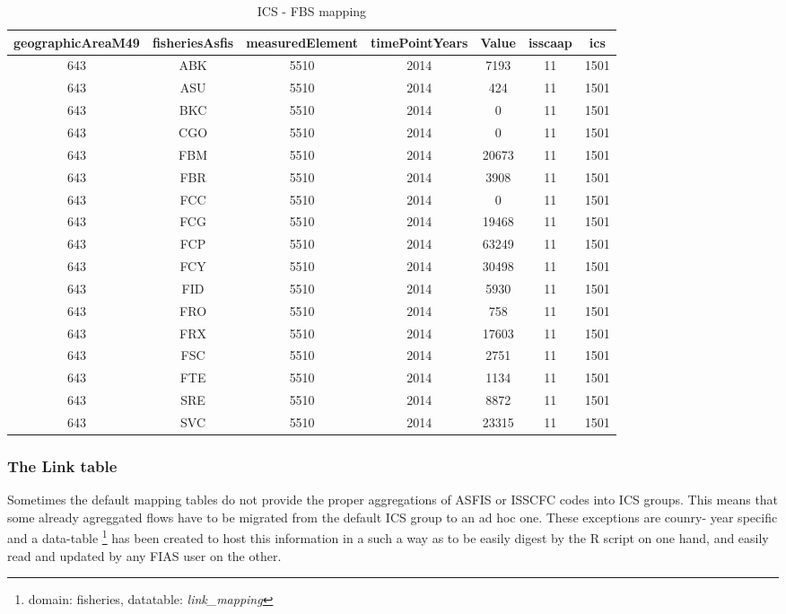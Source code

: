 \documentclass[nojss]{jss}
\begin{document}
\begin{landscape}
\begin{table}[t]
\caption{ICS - FBS mapping}
\centering
\begin{tabular}{c|c|c|c|c|c|c}
\toprule
geographicAreaM49 & fisheriesAsfis & measuredElement & timePointYears & Value & isscaap & ics \\
\midrule
643   &  ABK    & 5510 & 2014 &   7193   & 11 &  1501 \\
643   &  ASU    & 5510 & 2014 &   424    & 11 &  1501 \\ 
643   &  BKC    & 5510 & 2014 &   0      & 11 &  1501 \\
643   &  CGO    & 5510 & 2014 &   0      & 11 &  1501 \\
643   &  FBM    & 5510 & 2014 &   20673  & 11 &  1501 \\
643   &  FBR    & 5510 & 2014 &   3908   & 11 &  1501 \\  
643   &  FCC    & 5510 & 2014 &   0      & 11 &  1501 \\
643   &  FCG    & 5510 & 2014 &   19468  & 11 &  1501 \\
643   &  FCP    & 5510 & 2014 &   63249  & 11 &  1501 \\
643   &  FCY    & 5510 & 2014 &   30498  & 11 &  1501 \\ 
643   &  FID    & 5510 & 2014 &   5930   & 11 &  1501 \\
643   &  FRO    & 5510 & 2014 &   758    & 11 &  1501 \\
643   &  FRX    & 5510 & 2014 &   17603  & 11 &  1501 \\
643   &  FSC    & 5510 & 2014 &   2751   & 11 &  1501 \\  
643   &  FTE    & 5510 & 2014 &   1134   & 11 &  1501 \\
643   &  SRE    & 5510 & 2014 &   8872   & 11 &  1501 \\
643   &  SVC    & 5510 & 2014 &   23315  & 11 &  1501 \\

\bottomrule
\end{tabular}
\label{tab:xxx}
\end{table}
\end{landscape} 



\subsubsection{The Link table}

Sometimes the default mapping tables do not provide the proper aggregations of ASFIS or ISSCFC codes into ICS groups. This means that some already agreggated flows have to be migrated from the default ICS group to an ad hoc one. These exceptions are counry- year specific and a data-table \footnote{domain: fisheries, datatable: \textit{link_mapping}} has been created to host this information in a such a way as to be easily digest by the R script on one hand, and easily read and updated by any FIAS user on the other.
\end{document}
